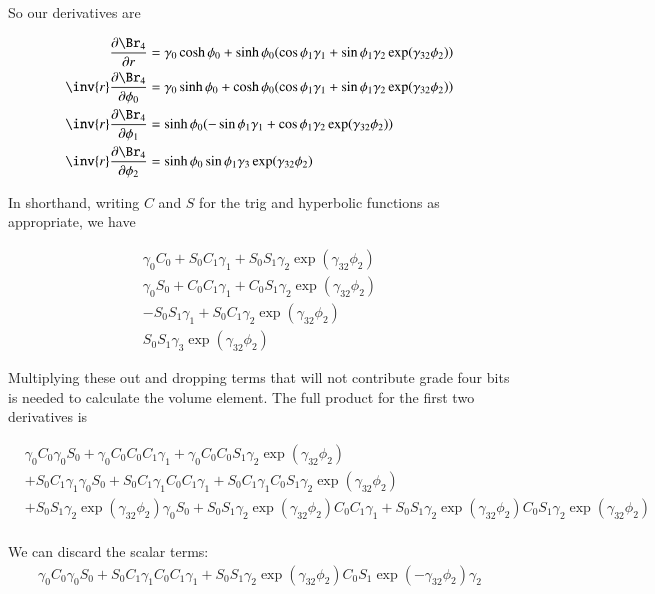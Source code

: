 \documentclass{article}
\begin{document}
So our derivatives are

\begin{align*}
\PD{r}{\Br_4} &= \gamma_0 \cosh \phi_0 + \sinh\phi_0 ( \cos\phi_1 \gamma_1 + \sin\phi_1 \gamma_2 \exp( \gamma_{32} \phi_2 )) \\
\inv{r}\PD{\phi_0}{\Br_4} &= \gamma_0 \sinh \phi_0 + \cosh\phi_0 ( \cos\phi_1 \gamma_1 + \sin\phi_1 \gamma_2 \exp( \gamma_{32} \phi_2 )) \\
\inv{r}\PD{\phi_1}{\Br_4} &= \sinh\phi_0 ( -\sin\phi_1 \gamma_1 + \cos\phi_1 \gamma_2 \exp( \gamma_{32} \phi_2 )) \\
\inv{r}\PD{\phi_2}{\Br_4} &= \sinh\phi_0 \sin\phi_1 \gamma_3 \exp( \gamma_{32} \phi_2 )
\end{align*}

In shorthand, writing $C$ and $S$ for the trig and hyperbolic functions as appropriate, we have

\begin{align*}
\gamma_0 C_0 + S_0 C_1 \gamma_1 + S_0 S_1 \gamma_2 \exp( \gamma_{32} \phi_2 )  \\
\gamma_0 S_0 + C_0 C_1 \gamma_1 + C_0 S_1 \gamma_2 \exp( \gamma_{32} \phi_2 )  \\
 -S_0 S_1 \gamma_1 + S_0 C_1 \gamma_2 \exp( \gamma_{32} \phi_2 )  \\
S_0 S_1 \gamma_3 \exp( \gamma_{32} \phi_2 )
\end{align*}

Multiplying these out and dropping terms that will not contribute grade four bits is needed to calculate the volume element.  
The full product for the first two derivatives is

\begin{align*}
&\gamma_0 C_0 \gamma_0 S_0
+\gamma_0 C_0 C_0 C_1 \gamma_1
+\gamma_0 C_0 C_0 S_1 \gamma_2 \exp( \gamma_{32} \phi_2 ) \\
&+S_0 C_1 \gamma_1 \gamma_0 S_0
+S_0 C_1 \gamma_1 C_0 C_1 \gamma_1
+S_0 C_1 \gamma_1 C_0 S_1 \gamma_2 \exp( \gamma_{32} \phi_2 ) \\
&+S_0 S_1 \gamma_2 \exp( \gamma_{32} \phi_2 ) \gamma_0 S_0
+S_0 S_1 \gamma_2 \exp( \gamma_{32} \phi_2 ) C_0 C_1 \gamma_1
+S_0 S_1 \gamma_2 \exp( \gamma_{32} \phi_2 ) C_0 S_1 \gamma_2 \exp( \gamma_{32} \phi_2 ) \\
\end{align*}

We can discard the scalar terms:
\begin{align*}
\gamma_0 C_0 \gamma_0 S_0 +S_0 C_1 \gamma_1 C_0 C_1 \gamma_1 +S_0 S_1 \gamma_2 \exp( \gamma_{32} \phi_2 ) C_0 S_1 \exp( -\gamma_{32} \phi_2 ) \gamma_2 
\end{align*}
\end{document}
